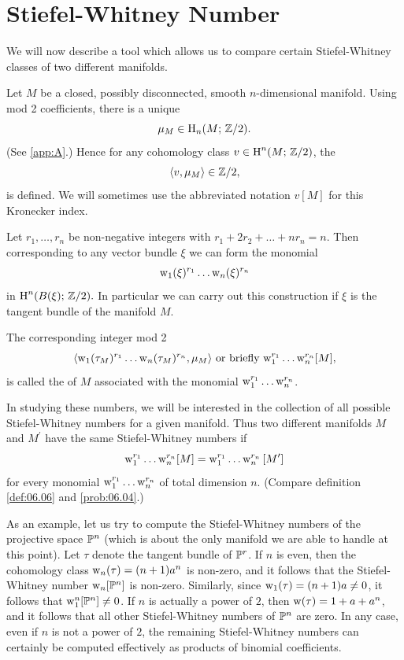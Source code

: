 \documentclass[../main]{subfiles}
\begin{document}
\section{Stiefel-Whitney Number}\label{sec:4.4}

We will now describe a tool which allows us to compare certain Stiefel-Whitney classes of two different manifolds.

Let $M$ be a closed, possibly disconnected, smooth $n$-dimensional manifold. Using mod 2 coefficients, there is a unique 
\[
\mu_{M} \in \operatorname{H}_{n}(M ; \, \mathbb{Z} / 2).
\]
(See \ref{app:A}.) Hence for any cohomology class $v \in \operatorname{H}^{n}(M ; \, \mathbb{Z} / 2)$, the 
\[
\langle v,\mu_{M}\rangle \in \mathbb{Z} / 2,
\]
is defined. We will sometimes use the abbreviated notation $v[M]$ for this Kronecker index.

Let $r_{1}, \dots, r_{n}$ be non-negative integers with $r_{1}+2 r_{2}+\dots+n r_{n}=n$. Then corresponding to any vector bundle $\xi$ we can form the monomial
\[
\operatorname{w}_{1}(\xi)^{r_{1}} \dots \operatorname{w}_{n}(\xi)^{r_{n}}
\]
in $\operatorname{H}^{n}(B(\xi) ;\, \mathbb{Z} / 2) .$ In particular we can carry out this construction if $\xi$ is the tangent bundle of the manifold $M$.

\begin{definition}
\label{def:04.02}
The corresponding integer mod 2
\[
\langle\operatorname{w}_{1}(\tau_{M})^{r_1} \dots \operatorname{w}_{n}(\tau_{M})^{r_n}, \mu_{M}\rangle
\text{ or briefly }
{\operatorname{w}}_{1}^{r_1} \dots \operatorname{w}_{n}^{r_n}[M],
\]
is called the  of $M$ associated with the monomial $\operatorname{w}_{1}^{r_{1}} \dots \operatorname{w}_{n}^{r_n}$.
\end{definition}

In studying these numbers, we will be interested in the collection of all possible Stiefel-Whitney numbers for a given manifold. Thus two different manifolds $M$ and $M^{\prime}$ have the same Stiefel-Whitney numbers if 
\[
\operatorname{w}_{1}^{r_{1}} \dots \operatorname{w}_{n}^{r_{n}} [M]=\operatorname{w}_{1}^{r_{1}} \dots \operatorname{w}_{n} ^{r_n}{[M^{\prime}]}
\]
for every monomial ${\operatorname{w}}_{1}^{r_{1}} \dots \operatorname{w}_{n}^{r_n}$ of total dimension $n$. (Compare definition \ref{def:06.06} and \ref{prob:06.04}.)

As an example, let us try to compute the Stiefel-Whitney numbers of the projective space $\mathbb{P}^{n}$ (which is about the only manifold we are able to handle at this point). Let $\tau$ denote the tangent bundle of $\mathbb{P}^{r}$. If $n$ is even, then the cohomology class $\operatorname{w}_{n}(\tau)=(n+1) a^{n}$ is non-zero, and it follows that the Stiefel-Whitney number $\operatorname{w}_{n}[\mathbb{P}^{n}]$ is non-zero. Similarly, since $\operatorname{w}_{1}(\tau)=(n+1) a \neq 0$, it follows that $\operatorname{w}_{1}^{n}[\mathbb{P}^{n}] \neq 0$. If $n$ is actually a power of $2$, then $\operatorname{w}(\tau)=1+a+a^{n}$, and it follows that all other Stiefel-Whitney numbers of $\mathbb{P}^{n}$ are zero. In any case, even if $n$ is not a power of $2$, the remaining Stiefel-Whitney numbers can certainly be computed effectively as products of binomial coefficients.
\end{document}
